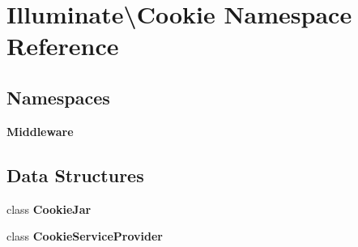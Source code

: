 \section{Illuminate\textbackslash{}Cookie Namespace Reference}
\label{namespace_illuminate_1_1_cookie}
\subsection*{Namespaces}
\begin{DoxyCompactItemize}
\item 
 {\bf Middleware}
\end{DoxyCompactItemize}
\subsection*{Data Structures}
\begin{DoxyCompactItemize}
\item 
class {\bf Cookie\+Jar}
\item 
class {\bf Cookie\+Service\+Provider}
\end{DoxyCompactItemize}
